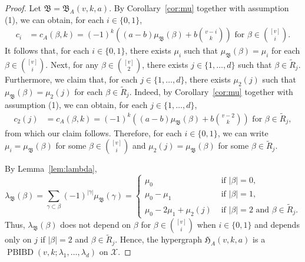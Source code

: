 \documentclass[11pt]{article}
\begin{document}
\begin{proof}%
Let $\mathfrak B = \mathfrak B_A(v,k,a)$.
By Corollary~\ref{cor:mu} 
together with assumption (1), we can obtain, for each $i\in\{0,1\}$, 
\begin{align*}
    c_i &= c_A(\beta,k)=(-1)^{k}\left((a-b)\mu_\mathfrak B(\beta)+b\binom{v-i}{k}\right)\text{ for }\beta\in\binom{[v]}{i}.
\end{align*}
It follows that, for each $i\in\{0,1\}$, there exists $\mu_i$ such that $\mu_\mathfrak B(\beta) = \mu_i$ for each $\beta \in \binom{[v]}{i}$.
Next, for any $\beta \in \binom{[v]}{2}$, there exists $j \in \{1,\dots,d\}$ such that $\beta \in \tilde{R}_j$.
Furthermore, we claim that, for each $j \in \{1,\dots,d\}$, there exists $\mu_2(j)$ such that $\mu_\mathfrak B(\beta) =\mu_2(j)$ for each $\beta \in \tilde{R}_j$.
Indeed, by Corollary~\ref{cor:mu} 
together with assumption (1), we can obtain, for each $j \in \{1,\dots,d\}$,
\begin{align*}
    c_2(j) &= c_A(\beta,k)=(-1)^{k}\left((a-b)\mu_\mathfrak B(\beta)+b\binom{v-2}{k}\right)\text{ for }\beta\in\tilde{R}_j,
\end{align*}
from which our claim follows.
Therefore, for each $i\in\{0,1\}$, we can write $\mu_i=\mu_\mathfrak B(\beta)$ for some $\beta \in \binom{[v]}{i}$ and $\mu_{2}(j)=\mu_\mathfrak B(\beta)$ for some $\beta \in \tilde{R}_j$.

By Lemma~\ref{lem:lambda},
$$
\lambda_\mathfrak B(\beta)=\sum_{\gamma\subset \beta}(-1)^{|\gamma|}\mu_\mathfrak B(\gamma)=\begin{cases}\mu_0 & \text{ if }|\beta|=0,\\
\mu_0-\mu_1 & \text{ if }|\beta|=1,\\
\mu_0-2\mu_1+\mu_{2}(j) & \text{ if }|\beta|=2 \text{ 
and }\beta\in \tilde{R}_j.
\end{cases} 
$$
Thus, $\lambda_\mathfrak B(\beta)$ does not depend on $\beta$ for $\beta \in \binom{[v]}{i}$ when $i\in\{0,1\}$ and depends only on $j$  if $|\beta|=2$ and $\beta\in \tilde{R}_j$.  
Hence, the hypergraph $\mathfrak H_{A}(v,k,a)$ 
is a $\operatorname{PBIBD}(v,k;\lambda_1,\ldots,\lambda_d)$ on $\mathcal{X}$.


\end{proof}
\end{document}
